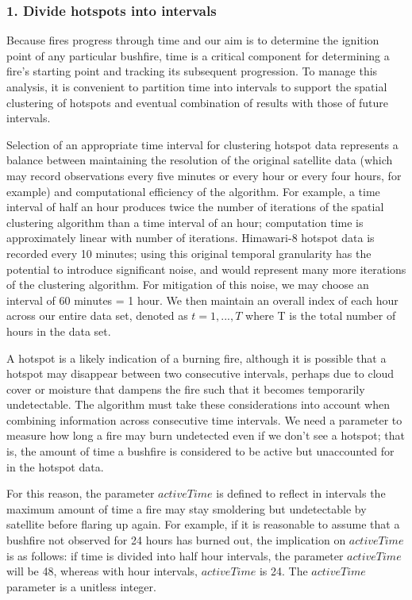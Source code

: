 \hypertarget{divide-hotspots-into-intervals}{%
\subsubsection{1. Divide hotspots into intervals}\label{divide-hotspots-into-intervals}}

Because fires progress through time and our aim is to determine the ignition point of any particular bushfire, time is a critical component for determining a fire's starting point and tracking its subsequent progression. To manage this analysis, it is convenient to partition time into intervals to support the spatial clustering of hotspots and eventual combination of results with those of future intervals.

Selection of an appropriate time interval for clustering hotspot data represents a balance between maintaining the resolution of the original satellite data (which may record observations every five minutes or every hour or every four hours, for example) and computational efficiency of the algorithm. For example, a time interval of half an hour produces twice the number of iterations of the spatial clustering algorithm than a time interval of an hour; computation time is approximately linear with number of iterations. Himawari-8 hotspot data is recorded every 10 minutes; using this original temporal granularity has the potential to introduce significant noise, and would represent many more iterations of the clustering algorithm. For mitigation of this noise, we may choose an interval of 60 minutes = 1 hour. We then maintain an overall index of each hour across our entire data set, denoted as \(t=1,...,T\) where T is the total number of hours in the data set.

A hotspot is a likely indication of a burning fire, although it is possible that a hotspot may disappear between two consecutive intervals, perhaps due to cloud cover or moisture that dampens the fire such that it becomes temporarily undetectable. The algorithm must take these considerations into account when combining information across consecutive time intervals. We need a parameter to measure how long a fire may burn undetected even if we don't see a hotspot; that is, the amount of time a bushfire is considered to be active but unaccounted for in the hotspot data.

For this reason, the parameter \(activeTime\) is defined to reflect in intervals the maximum amount of time a fire may stay smoldering but undetectable by satellite before flaring up again. For example, if it is reasonable to assume that a bushfire not observed for 24 hours has burned out, the implication on \(activeTime\) is as follows: if time is divided into half hour intervals, the parameter \(activeTime\) will be 48, whereas with hour intervals, \(activeTime\) is 24. The \(activeTime\) parameter is a unitless integer.

